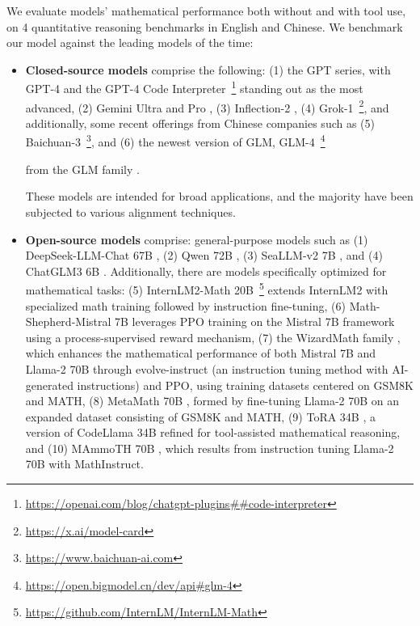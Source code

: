 \begin{itemize}[topsep=0pt]
We evaluate models' mathematical performance both without and with tool use, on 4 quantitative reasoning benchmarks in English and Chinese. We benchmark our model against the leading models of the time:

\begin{itemize}[topsep=0pt]
    \item \textbf{Closed-source models} comprise the following: (1) the GPT series, with GPT-4 \citep{gpt4} and the GPT-4 Code Interpreter~\footnote{\url{https://openai.com/blog/chatgpt-plugins\#\#code-interpreter}} standing out as the most advanced, (2) Gemini Ultra and Pro \citep{gemini}, (3) Inflection-2 \citep{inflection-2}, (4) Grok-1~\footnote{\url{https://x.ai/model-card}}, and additionally, some recent offerings from Chinese companies such as (5) Baichuan-3~\footnote{\url{https://www.baichuan-ai.com}}, and (6) the newest version of GLM, GLM-4~\footnote{\url{https://open.bigmodel.cn/dev/api\#glm-4}}

    from the GLM family \citep{glm}.

These models are intended for broad applications, and the majority have been subjected to various alignment techniques.

\item \textbf{Open-source models} comprise: general-purpose models such as (1) DeepSeek-LLM-Chat 67B \citep{deepseek-llm}, (2) Qwen 72B \citep{qwen}, (3) SeaLLM-v2 7B \citep{seallm}, and (4) ChatGLM3 6B \citep{chatglm3}. Additionally, there are models specifically optimized for mathematical tasks: (5) InternLM2-Math 20B~\footnote{\url{https://github.com/InternLM/InternLM-Math}} extends InternLM2 with specialized math training followed by instruction fine-tuning, (6) Math-Shepherd-Mistral 7B leverages PPO training \citep{schulman2017proximal} on the Mistral 7B \citep{mistral} framework using a process-supervised reward mechanism, (7) the WizardMath family \citep{wizardmath}, which enhances the mathematical performance of both Mistral 7B and Llama-2 70B \citep{llama2} through evolve-instruct (an instruction tuning method with AI-generated instructions) and PPO, using training datasets centered on GSM8K and MATH, (8) MetaMath 70B \citep{metamath}, formed by fine-tuning Llama-2 70B on an expanded dataset consisting of GSM8K and MATH, (9) ToRA 34B \cite{tora}, a version of CodeLlama 34B refined for tool-assisted mathematical reasoning, and (10) MAmmoTH 70B \citep{MathInstruct}, which results from instruction tuning Llama-2 70B with MathInstruct.


\end{itemize}
\end{itemize}
